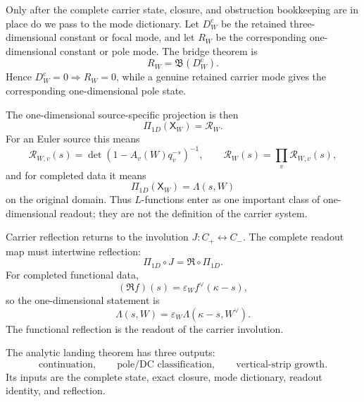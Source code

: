 \documentclass[11pt]{article}
\theoremstyle{definition}
\begin{document}
Only after the complete carrier state, closure, and obstruction bookkeeping are
in place do we pass to the mode dictionary.  Let \(D_W^{\mathrm c}\) be the
retained three-dimensional constant or focal mode, and let \(R_W\) be the
corresponding one-dimensional constant or pole mode.  The bridge theorem is
\[
R_W=\mathfrak B(D_W^{\mathrm c}).
\]
Hence \(D_W^{\mathrm c}=0\Rightarrow R_W=0\), while a genuine retained carrier
mode gives the corresponding one-dimensional pole state.

The one-dimensional source-specific projection is then
\[
\Pi_{1D}(\mathsf X_W)=\mathcal R_W.
\]
For an Euler source this means
\[
\mathcal R_{W,v}(s)=\det(1-A_v(W)q_v^{-s})^{-1},
\qquad
\mathcal R_W(s)=\prod_v\mathcal R_{W,v}(s),
\]
and for completed data it means
\[
\Pi_{1D}(\mathsf X_W)=\Lambda(s,W)
\]
on the original domain.  Thus \(L\)-functions enter as one important class of
one-dimensional readout; they are not the definition of the carrier system.

Carrier reflection returns to the involution \(J:C_+\leftrightarrow C_-\).  The
complete readout map must intertwine reflection:
\[
\Pi_{1D}\circ J=\mathfrak R\circ\Pi_{1D}.
\]
For completed functional data,
\[
(\mathfrak R f)(s)=\varepsilon_W f^\vee(\kappa-s),
\]
so the one-dimensional statement is
\[
\Lambda(s,W)=\varepsilon_W\Lambda(\kappa-s,W^\vee).
\]
The functional reflection is the readout of the carrier involution.

The analytic landing theorem has three outputs:
\[
\boxed{\text{continuation}},
\qquad
\boxed{\text{pole/DC classification}},
\qquad
\boxed{\text{vertical-strip growth}}.
\]
Its inputs are the complete state, exact closure, mode dictionary, readout
identity, and reflection.

\end{document}
